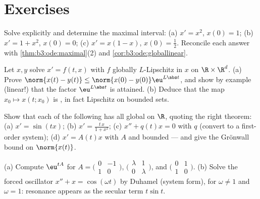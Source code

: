 \section{Exercises}

\begin{exercise}[$\star$]\label{exo:b3:ode:1}
Solve explicitly and determine the maximal interval:
(a) $x' = x^2$, $x(0) = 1$; (b) $x' = 1 + x^2$, $x(0) = 0$;
(c) $x' = x(1-x)$, $x(0) = \frac12$. Reconcile each answer
with \cref{thm:b3:ode:maximal}(2) and
\cref{cor:b3:ode:globallinear}.
\end{exercise}

\begin{exercise}[$\star$]\label{exo:b3:ode:2}
Let $x, y$ solve $x' = f(t,x)$ with $f$ globally
$L$-Lipschitz in $x$ on $\R\times\R^d$.
(a) Prove $\norm{x(t) - y(t)} \leq \norm{x(0) -
y(0)}\eu^{L\abs t}$, and show by example (linear!) that the
factor $\eu^{L\abs t}$ is attained.
(b) Deduce that the  map $x_0 \mapsto x(t; x_0)$ is
, in fact Lipschitz on bounded sets.
\end{exercise}

\begin{exercise}[$\star\star$]\label{exo:b3:ode:3}
Show that each of the following has all 
global on $\R$, quoting the right theorem:
(a) $x' = \sin(tx)$;
(b) $x' = \frac{t\,x}{1 + x^2}$;
(c) $x'' + q(t)x = 0$ with $q$  (convert to a
first-order system);
(d) $x' = A(t)x$ with $A$  and bounded --- and give
the Gr\"onwall bound on $\norm{x(t)}$.
\end{exercise}

\begin{exercise}[$\star\star$]\label{exo:b3:ode:4}
(a) Compute $\eu^{tA}$ for
$A = \bigl(\begin{smallmatrix}0 & -1\\ 1 &
0\end{smallmatrix}\bigr)$,
$\bigl(\begin{smallmatrix}\lambda & 1\\ 0 &
\lambda\end{smallmatrix}\bigr)$, and
$\bigl(\begin{smallmatrix}0 & 1\\ 1 &
0\end{smallmatrix}\bigr)$.
(b) Solve the forced oscillator $x'' + x = \cos(\omega t)$
by Duhamel (system form), for $\omega \neq 1$ and $\omega =
1$: resonance appears as the secular term $t\sin t$.
\end{exercise}

